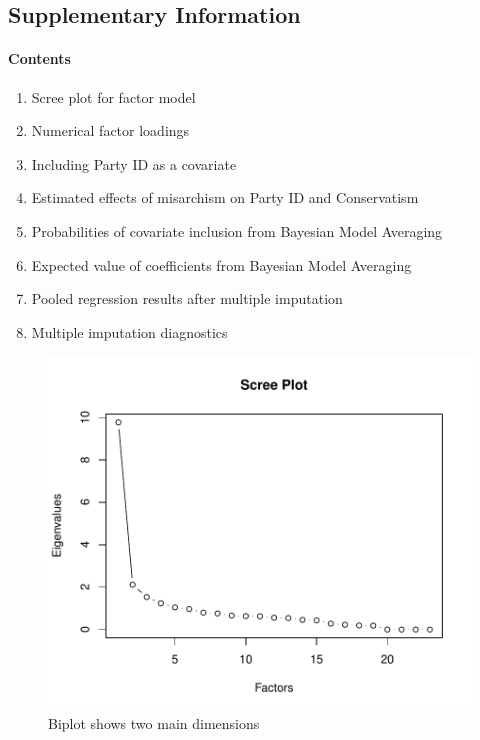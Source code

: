 \documentclass[12pt,]{article}
\begin{document}
\pagebreak

\subsection{Supplementary Information}\label{supplementary-information}

\paragraph{Contents}\label{contents}

\begin{enumerate}
\def\labelenumi{\arabic{enumi}.}
\itemsep1pt\parskip0pt
\item
  Scree plot for factor model
\item
  Numerical factor loadings
\item
  Including Party ID as a covariate
\item
  Estimated effects of misarchism on Party ID and Conservatism
\item
  Probabilities of covariate inclusion from Bayesian Model Averaging
\item
  Expected value of coefficients from Bayesian Model Averaging
\item
  Pooled regression results after multiple imputation
\item
  Multiple imputation diagnostics
\end{enumerate}

\begin{figure}[htbp]
\centering
\includegraphics{figures/scree-1.pdf}
\caption{Biplot shows two main dimensions}
\end{figure}
\end{document}
